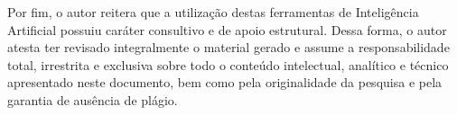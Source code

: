 Por fim, o autor reitera que a utilização destas ferramentas de Inteligência Artificial possuiu caráter consultivo e de apoio estrutural. Dessa forma, o autor atesta ter revisado integralmente o material gerado e assume a responsabilidade total, irrestrita e exclusiva sobre todo o conteúdo intelectual, analítico e técnico apresentado neste documento, bem como pela originalidade da pesquisa e pela garantia de ausência de plágio.